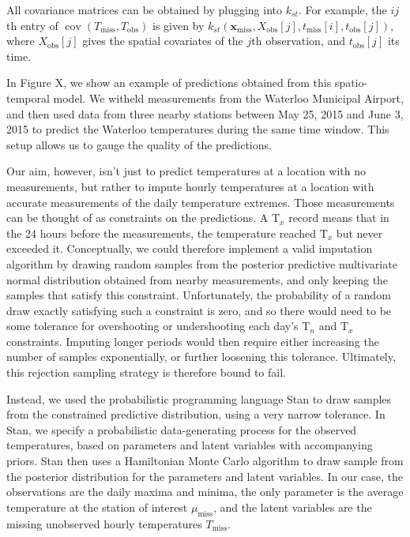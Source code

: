 \documentclass[letter]{article}
\newcommand{\genericdel}[3]{%
      \left#1#3\right#2
    }
\newcommand{\del}[1]{\genericdel(){#1}}
\newcommand{\sbr}[1]{\genericdel[]{#1}}
\DeclareMathOperator{\cov}{{cov}}
\newcommand{\Tn}{\mathrm{T}_{n}}
\newcommand{\Tx}{\mathrm{T}_{x}}
\newcommand{\xvec}{\mathbf{x}}
\newcommand{\miss}{\mathrm{miss}}
\newcommand{\obs}{\mathrm{obs}}
\begin{document}
All covariance matrices can be obtained by plugging into \(k_{st}\). For
example, the \(ij\)th entry of \(\cov\del{T_\miss, T_\obs}\) is given by
\(k_{st}(\xvec_\miss,X_\obs\sbr{j},t_\miss\sbr{i},t_\obs\sbr{j})\),
where \(X_\obs\sbr{j}\) gives the spatial covariates of the \(j\)th
observation, and \(t_\obs\sbr{j}\) its time.

In Figure X, we show an example of predictions obtained from this
spatio-temporal model. We witheld measurements from the Waterloo
Municipal Airport, and then used data from three nearby stations between
May 25, 2015 and June 3, 2015 to predict the Waterloo temperatures
during the same time window. This setup allows us to gauge the quality
of the predictions.
    


    	Our aim, however, isn't just to predict temperatures at a location with
no measurements, but rather to impute hourly temperatures at a location
with accurate measurements of the daily temperature extremes. Those
measurements can be thought of as constraints on the predictions. A
\(\Tx\) record means that in the 24 hours before the measurements, the
temperature reached \(\Tx\) but never exceeded it. Conceptually, we
could therefore implement a valid imputation algorithm by drawing random
samples from the posterior predictive multivariate normal distribution
obtained from nearby measurements, and only keeping the samples that
satisfy this constraint. Unfortunately, the probability of a random draw
exactly satisfying such a constraint is zero, and so there would need to
be some tolerance for overshooting or undershooting each day's \(\Tn\)
and \(\Tx\) constraints. Imputing longer periods would then require
either increasing the number of samples exponentially, or further
loosening this tolerance. Ultimately, this rejection sampling strategy
is therefore bound to fail.

Instead, we used the probabilistic programming language Stan to draw
samples from the constrained predictive distribution, using a very
narrow tolerance. In Stan, we specify a probabilistic data-generating
process for the observed temperatures, based on parameters and latent
variables with accompanying priors. Stan then uses a Hamiltonian Monte
Carlo algorithm to draw sample from the posterior distribution for the
parameters and latent variables. In our case, the observations are the
daily maxima and minima, the only parameter is the average temperature
at the station of interest \(\mu_\miss\), and the latent variables are
the missing unobserved hourly temperatures \(T_\miss\).
\end{document}
